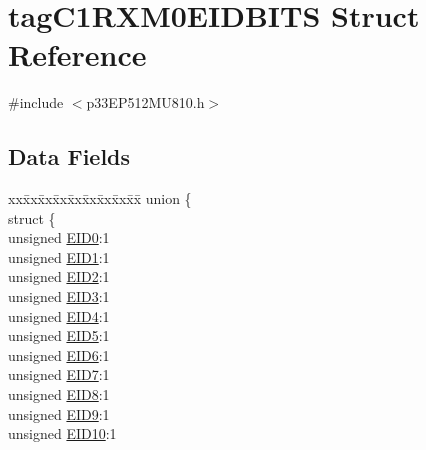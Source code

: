 \hypertarget{structtag_c1_r_x_m0_e_i_d_b_i_t_s}{}\section{tag\+C1\+R\+X\+M0\+E\+I\+D\+B\+I\+TS Struct Reference}
\label{structtag_c1_r_x_m0_e_i_d_b_i_t_s}


{\ttfamily \#include $<$p33\+E\+P512\+M\+U810.\+h$>$}

\subsection*{Data Fields}
\begin{DoxyCompactItemize}
\item 
\begin{tabbing}
xx\=xx\=xx\=xx\=xx\=xx\=xx\=xx\=xx\=\kill
union \{\\
\>struct \{\\
\>\>unsigned \hyperlink{structtag_c1_r_x_m0_e_i_d_b_i_t_s_a9da8b7b30247e4f9cd8cc056549aa9fd}{EID0}:1\\
\>\>unsigned \hyperlink{structtag_c1_r_x_m0_e_i_d_b_i_t_s_afd6c139491d147c1262f3d051c6691e9}{EID1}:1\\
\>\>unsigned \hyperlink{structtag_c1_r_x_m0_e_i_d_b_i_t_s_a36ec62d8d3c5acd5d15e6691dc099a94}{EID2}:1\\
\>\>unsigned \hyperlink{structtag_c1_r_x_m0_e_i_d_b_i_t_s_ab895f7d0ac289a0383b607cbc62eebe2}{EID3}:1\\
\>\>unsigned \hyperlink{structtag_c1_r_x_m0_e_i_d_b_i_t_s_a136d5a709d6618d40acceccb43036656}{EID4}:1\\
\>\>unsigned \hyperlink{structtag_c1_r_x_m0_e_i_d_b_i_t_s_a8dffb2d86a6c184df505ae7c71a58710}{EID5}:1\\
\>\>unsigned \hyperlink{structtag_c1_r_x_m0_e_i_d_b_i_t_s_af8a8574102515d8f1a4b7fd1685d0532}{EID6}:1\\
\>\>unsigned \hyperlink{structtag_c1_r_x_m0_e_i_d_b_i_t_s_a84c3262e67f8d5fd387ac10bde6fa9b1}{EID7}:1\\
\>\>unsigned \hyperlink{structtag_c1_r_x_m0_e_i_d_b_i_t_s_acca25e0b7d86eb499d01f85222baea87}{EID8}:1\\
\>\>unsigned \hyperlink{structtag_c1_r_x_m0_e_i_d_b_i_t_s_ac6748f73d4ada8538b06548be4f396c2}{EID9}:1\\
\>\>unsigned \hyperlink{structtag_c1_r_x_m0_e_i_d_b_i_t_s_a9cea8e77ecbb72bd3b08102412793725}{EID10}:1\\

\end{tabbing}
\end{DoxyCompactItemize}
